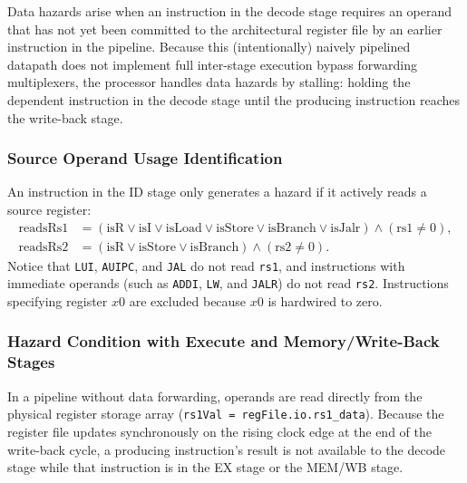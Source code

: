 Data hazards arise when an instruction in the decode stage requires an operand that has not yet been committed to the architectural register file by an earlier instruction in the pipeline. Because this (intentionally) naively pipelined datapath does not implement full inter-stage execution bypass forwarding multiplexers, the processor handles data hazards by stalling: holding the dependent instruction in the decode stage until the producing instruction reaches the write-back stage.

\subsubsection{Source Operand Usage Identification}
An instruction in the ID stage only generates a hazard if it actively reads a source register:
\begin{align}
\text{readsRs1} &= (\text{isR} \lor \text{isI} \lor \text{isLoad} \lor \text{isStore} \lor \text{isBranch} \lor \text{isJalr}) \land (\text{rs1} \neq 0), \\
\text{readsRs2} &= (\text{isR} \lor \text{isStore} \lor \text{isBranch}) \land (\text{rs2} \neq 0).
\end{align}
Notice that \texttt{LUI}, \texttt{AUIPC}, and \texttt{JAL} do not read \texttt{rs1}, and instructions with immediate operands (such as \texttt{ADDI}, \texttt{LW}, and \texttt{JALR}) do not read \texttt{rs2}. Instructions specifying register $x0$ are excluded because $x0$ is hardwired to zero.

\subsubsection{Hazard Condition with Execute and Memory/Write-Back Stages}
In a pipeline without data forwarding, operands are read directly from the physical register storage array (\texttt{rs1Val = regFile.io.rs1\_data}). Because the register file updates synchronously on the rising clock edge at the end of the write-back cycle, a producing instruction's result is not available to the decode stage while that instruction is in the EX stage or the MEM/WB stage.

